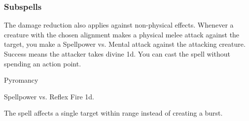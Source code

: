 \subsubsection{Subspells}
The damage reduction also applies against non-physical effects.
Whenever a creature with the chosen alignment makes a physical melee attack against the target, you make a Spellpower vs. Mental attack against the attacking creature.
Success means the attacker takes divine  \minus1d.
You can cast the spell without spending an action point.
\begin{spellsection}{Pyromancy}
\begin{spellheader}
\end{spellheader}
\begin{spellcontent}
\begin{spelltargetinginfo}
\end{spelltargetinginfo}
\begin{spelleffects}
\begin{spellattack}{Spellpower vs. Reflex}
\spellsuccess Fire  \minus1d.
\end{spellattack}
\end{spelleffects}
\end{spellcontent}
\begin{spellfooter}
\end{spellfooter}
\begin{spellsubcontent}
\begin{spellcantrip}
The spell affects a single target within range instead of creating a burst.
\end{spellcantrip}
\end{spellsubcontent}
\end{spellsection}

